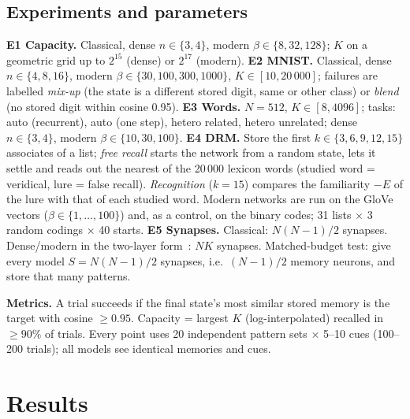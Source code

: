 \documentclass[conference]{IEEEtran}
\begin{document}
\subsection{Experiments and parameters}
\textbf{E1 Capacity.} Classical, dense $n\in\{3,4\}$, modern $\beta\in\{8,32,128\}$; $K$ on a geometric grid up to $2^{15}$ (dense) or $2^{17}$ (modern). \textbf{E2 MNIST.} Classical, dense $n\in\{4,8,16\}$, modern $\beta\in\{30,100,300,1000\}$, $K\in[10,20\,000]$; failures are labelled \emph{mix-up} (the state is a different stored digit, same or other class) or \emph{blend} (no stored digit within cosine 0.95). \textbf{E3 Words.} $N=512$, $K\in[8,4096]$; tasks: auto (recurrent), auto (one step), hetero related, hetero unrelated; dense $n\in\{3,4\}$, modern $\beta\in\{10,30,100\}$. \textbf{E4 DRM.} Store the first $k\in\{3,6,9,12,15\}$ associates of a list; \emph{free recall} starts the network from a random state, lets it settle and reads out the nearest of the 20\,000 lexicon words (studied word = veridical, lure = false recall). \emph{Recognition} ($k=15$) compares the familiarity $-E$ of the lure with that of each studied word. Modern networks are run on the GloVe vectors ($\beta\in\{1,\ldots,100\}$) and, as a control, on the binary codes; 31 lists $\times$ 3 random codings $\times$ 40 starts. \textbf{E5 Synapses.} Classical: $N(N{-}1)/2$ synapses. Dense/modern in the two-layer form~\cite{krotov21}: $NK$ synapses. Matched-budget test: give every model $S=N(N{-}1)/2$ synapses, i.e.\ $(N{-}1)/2$ memory neurons, and store that many patterns.

\textbf{Metrics.} A trial succeeds if the final state's most similar stored memory is the target with cosine $\ge0.95$. Capacity = largest $K$ (log-interpolated) recalled in $\ge90\%$ of trials. Every point uses 20 independent pattern sets $\times$ 5--10 cues (100--200 trials); all models see identical memories and cues.

\section{Results}
\end{document}
